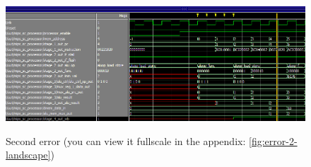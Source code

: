 \begin{figure}[h]
	\caption{Second error (you can view it fullscale in the appendix:
\ref{fig:error-2-landscape})}
	\includegraphics[scale=0.5]{figures/error_2.png}
	\label{fig:error-2-text}
\end{figure}
